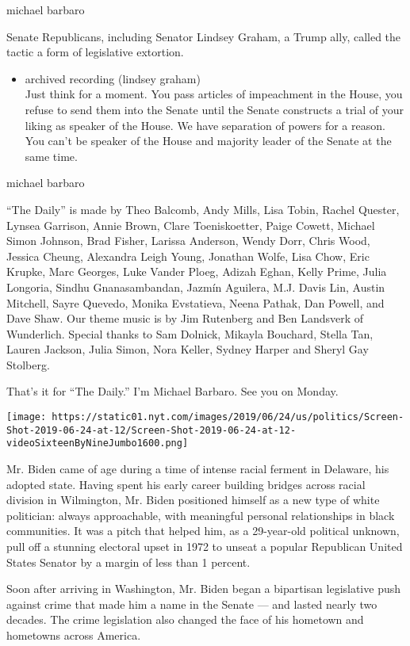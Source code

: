 michael barbaro

Senate Republicans, including Senator Lindsey Graham, a Trump ally,
called the tactic a form of legislative extortion.

\begin{itemize}
\tightlist
\item
  archived recording (lindsey graham)\\
  Just think for a moment. You pass articles of impeachment in the
  House, you refuse to send them into the Senate until the Senate
  constructs a trial of your liking as speaker of the House. We have
  separation of powers for a reason. You can't be speaker of the House
  and majority leader of the Senate at the same time.
\end{itemize}

michael barbaro

``The Daily'' is made by Theo Balcomb, Andy Mills, Lisa Tobin, Rachel
Quester, Lynsea Garrison, Annie Brown, Clare Toeniskoetter, Paige
Cowett, Michael Simon Johnson, Brad Fisher, Larissa Anderson, Wendy
Dorr, Chris Wood, Jessica Cheung, Alexandra Leigh Young, Jonathan Wolfe,
Lisa Chow, Eric Krupke, Marc Georges, Luke Vander Ploeg, Adizah Eghan,
Kelly Prime, Julia Longoria, Sindhu Gnanasambandan, Jazmín Aguilera,
M.J. Davis Lin, Austin Mitchell, Sayre Quevedo, Monika Evstatieva, Neena
Pathak, Dan Powell, and Dave Shaw. Our theme music is by Jim Rutenberg
and Ben Landsverk of Wunderlich. Special thanks to Sam Dolnick, Mikayla
Bouchard, Stella Tan, Lauren Jackson, Julia Simon, Nora Keller, Sydney
Harper and Sheryl Gay Stolberg.

That's it for ``The Daily.'' I'm Michael Barbaro. See you on Monday.

\texttt{[image: https://static01.nyt.com/images/2019/06/24/us/politics/Screen-Shot-2019-06-24-at-12/Screen-Shot-2019-06-24-at-12-videoSixteenByNineJumbo1600.png]}

Mr. Biden came of age during a time of intense racial ferment in
Delaware, his adopted state. Having spent his early career building
bridges across racial division in Wilmington, Mr. Biden positioned
himself as a new type of white politician: always approachable, with
meaningful personal relationships in black communities. It was a pitch
that helped him, as a 29-year-old political unknown, pull off a stunning
electoral upset in 1972 to unseat a popular Republican United States
Senator by a margin of less than 1 percent.

Soon after arriving in Washington, Mr. Biden began a bipartisan
legislative push against crime that made him a name in the Senate ---
and lasted nearly two decades. The crime legislation also changed the
face of his hometown and hometowns across America.

